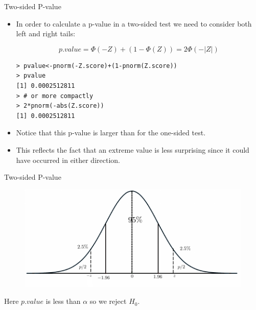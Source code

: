 \documentclass[handout]{beamer}
\begin{document}
\begin{frame}[fragile]{Two-sided P-value}
\scriptsize{
\begin{itemize}

\item In order to calculate a p-value in a two-sided test we need to consider both left and right tails:

\begin{displaymath}
 p.value = \Phi(-Z)+(1-\Phi(Z))=2\Phi(-|Z|)
\end{displaymath}



\begin{verbatim}
> pvalue<-pnorm(-Z.score)+(1-pnorm(Z.score))
> pvalue
[1] 0.0002512811
> # or more compactly
> 2*pnorm(-abs(Z.score))
[1] 0.0002512811
\end{verbatim}

\item Notice that this p-value is larger than for the one-sided test.

\item This reflects the fact that an extreme value is less surprising since it could have occurred in either direction.
\end{itemize}

} 
\end{frame}


\begin{frame}{Two-sided P-value}

 
 
  \begin{figure}[h!]
	\centering
	\includegraphics[scale=0.8]{pics/twosidepval.pdf}
\end{figure}

Here $p.value$ is less than $\alpha$ so we reject $H_0$.




\end{frame}
\end{document}
